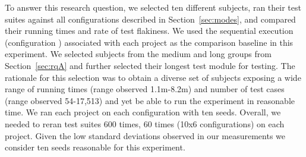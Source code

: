 To answer this research question, we selected ten different subjects,
ran their test suites against all configurations described in
Section~\ref{sec:modes}, and compared their running times and rate of
test flakiness.  We used the sequential execution (configuration
\emph{\Seq{}}) associated with each project as the comparison baseline
in this experiment.  We selected subjects from the medium and long
groups from Section~\ref{sec:rqA} and further selected their longest
test module for testing.  The rationale for this selection was to
obtain a diverse set of subjects exposing a wide range of running
times (range observed 1.1m-8.2m) and number of test cases (range
observed 54-17,513) and yet be able to run the experiment in
reasonable time.  We ran each project on each configuration with ten
seeds.  Overall, we needed to reran test suites 600 times, 60 times
(10x6 configurations) on each project.  Given the low standard
deviations observed in our measurements we consider ten seeds
reasonable for this experiment.

